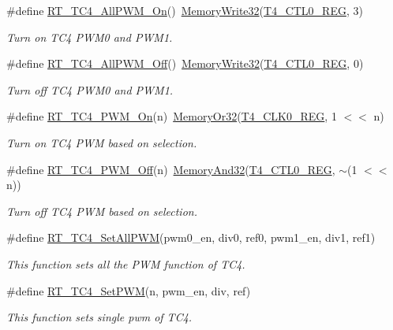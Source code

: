 \begin{DoxyCompactItemize}
\item 
\#define \mbox{\hyperlink{a00050_af7e9317dddf60349a86619afdef1fba8}{R\+T\+\_\+\+T\+C4\+\_\+\+All\+P\+W\+M\+\_\+\+On}}()~\mbox{\hyperlink{a00020_a6b9732365b12e48ddb89fe1028b975b0}{Memory\+Write32}}(\mbox{\hyperlink{a00020_a83136367fd85cd43cec90995ad0f51ef}{T4\+\_\+\+C\+T\+L0\+\_\+\+R\+EG}}, 3)
\begin{DoxyCompactList}\small\item\em Turn on T\+C4 P\+W\+M0 and P\+W\+M1. \end{DoxyCompactList}\item 
\#define \mbox{\hyperlink{a00050_a810820140a90f26db974ea72d81fac27}{R\+T\+\_\+\+T\+C4\+\_\+\+All\+P\+W\+M\+\_\+\+Off}}()~\mbox{\hyperlink{a00020_a6b9732365b12e48ddb89fe1028b975b0}{Memory\+Write32}}(\mbox{\hyperlink{a00020_a83136367fd85cd43cec90995ad0f51ef}{T4\+\_\+\+C\+T\+L0\+\_\+\+R\+EG}}, 0)
\begin{DoxyCompactList}\small\item\em Turn off T\+C4 P\+W\+M0 and P\+W\+M1. \end{DoxyCompactList}\item 
\#define \mbox{\hyperlink{a00050_a383c7817a2e822ccda0e28744c7d3d76}{R\+T\+\_\+\+T\+C4\+\_\+\+P\+W\+M\+\_\+\+On}}(n)~\mbox{\hyperlink{a00020_a27874a97deab7cecdde5ddecf466e31e}{Memory\+Or32}}(\mbox{\hyperlink{a00020_af2047cbb251e0693548f017a0874efbf}{T4\+\_\+\+C\+L\+K0\+\_\+\+R\+EG}}, 1 $<$$<$ n)
\begin{DoxyCompactList}\small\item\em Turn on T\+C4 P\+WM based on selection. \end{DoxyCompactList}\item 
\#define \mbox{\hyperlink{a00050_aaa61aa650a6b2f59bbcb78ae836c82e9}{R\+T\+\_\+\+T\+C4\+\_\+\+P\+W\+M\+\_\+\+Off}}(n)~\mbox{\hyperlink{a00020_ad87cedffcaadc51db22594fce55173d4}{Memory\+And32}}(\mbox{\hyperlink{a00020_a83136367fd85cd43cec90995ad0f51ef}{T4\+\_\+\+C\+T\+L0\+\_\+\+R\+EG}}, $\sim$(1 $<$$<$ n))
\begin{DoxyCompactList}\small\item\em Turn off T\+C4 P\+WM based on selection. \end{DoxyCompactList}\item 
\#define \mbox{\hyperlink{a00050_ad6b804bb230129a442fe9ce55e3bd2f6}{R\+T\+\_\+\+T\+C4\+\_\+\+Set\+All\+P\+WM}}(pwm0\+\_\+en,  div0,  ref0,  pwm1\+\_\+en,  div1,  ref1)
\begin{DoxyCompactList}\small\item\em This function sets all the P\+WM function of T\+C4. \end{DoxyCompactList}\item 
\#define \mbox{\hyperlink{a00050_ada2806f77e8e1cf7e64c5b9e13479119}{R\+T\+\_\+\+T\+C4\+\_\+\+Set\+P\+WM}}(n,  pwm\+\_\+en,  div,  ref)
\begin{DoxyCompactList}\small\item\em This function sets single pwm of T\+C4. \end{DoxyCompactList}\end{DoxyCompactItemize}


